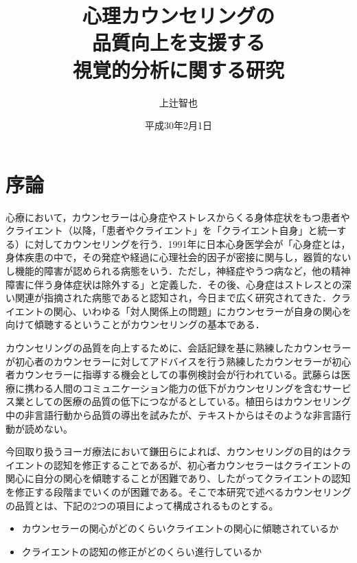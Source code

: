 \documentclass[shuuron]{kuee}
\title{心理カウンセリングの\\品質向上を支援する\\視覚的分析に関する研究}
\author{上辻智也}
\date{平成30年2月1日}
\begin{document}
\maketitle
\tableofcontents


\chapter{序論}



心療において，カウンセラーは心身症やストレスからくる身体症状をもつ患者やクライエント（以降，「患者やクライエント」を「クライエント自身」と統一する）に対してカウンセリングを行う．1991年に日本心身医学会が「心身症とは，身体疾患の中で，その発症や経過に心理社会的因子が密接に関与し，器質的ないし機能的障害が認められる病態をいう．ただし，神経症やうつ病など，他の精神障害に伴う身体症状は除外する」と定義した\cite{shinshinigaku}．その後、心身症はストレスとの深い関連が指摘された病態であると認知され，今日まで広く研究されてきた．クライエントの関心、いわゆる「対人関係上の問題」にカウンセラーが自身の関心を向けて傾聴するということがカウンセリングの基本である\cite{zokad}．







カウンセリングの品質を向上するために、会話記録を基に熟練したカウンセラーが初心者のカウンセラーに対してアドバイスを行う熟練したカウンセラーが初心者カウンセラーに指導する機会としての事例検討会が行われている。武藤ら\cite{武藤清栄2007人間関係やコミュニケーション障害による生産性の低下}は医療に携わる人間のコミュニケーション能力の低下がカウンセリングを含むサービス業としての医療の品質の低下につながるとしている。植田ら\cite{植田一博2006会話の分析とモデル化}はカウンセリング中の非言語行動から品質の導出を試みたが、テキストからはそのような非言語行動が読めない。

今回取り扱うヨーガ療法において鎌田ら\cite{Darshana}によれば、カウンセリングの目的はクライエントの認知を修正することであるが、初心者カウンセラーはクライエントの関心に自分の関心を傾聴することが困難であり、したがってクライエントの認知を修正する段階までいくのが困難である。そこで本研究で述べるカウンセリングの品質とは、下記の2つの項目によって構成されるものとする。
\begin{itemize}
  \item カウンセラーの関心がどのくらいクライエントの関心に傾聴されているか
  \item クライエントの認知の修正がどのくらい進行しているか
\end{itemize}
\end{document}
